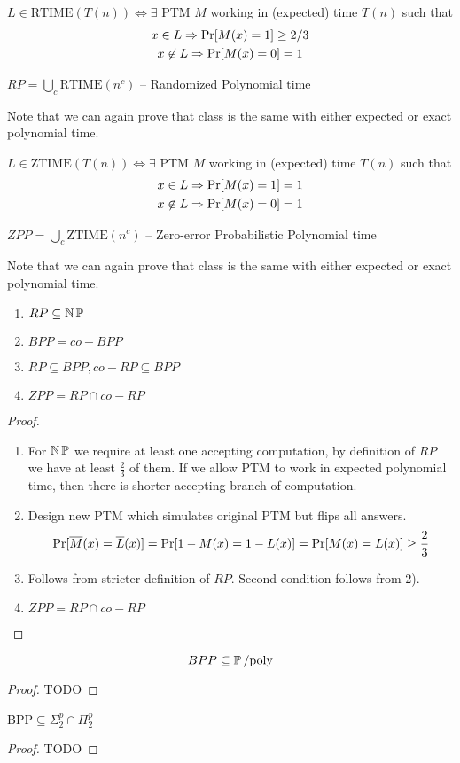 \begin{definition}[RTIME, RP]
	$L\in\text{RTIME}(T(n))\Leftrightarrow\exists$ PTM $M$ working in (expected) time $T(n)$ such that
    \begin{gather*}
    	x\in L\Rightarrow \operatorname{Pr}[M(x)=1]\geq 2/3\\
	x\not\in L\Rightarrow\operatorname{Pr}[M(x)=0]=1
    \end{gather*}

    $RP=\bigcup_c\text{RTIME}(n^c)$ -- Randomized Polynomial time

    Note that we can again prove that class is the same with either expected or exact polynomial time.
\end{definition}
\begin{definition}
    $L\in\text{ZTIME}(T(n))\Leftrightarrow\exists$ PTM $M$ working in (expected) time $T(n)$ such that
    \begin{gather*}
    	x\in L\Rightarrow \operatorname{Pr}[M(x)=1]=1\\
	x\not\in L\Rightarrow\operatorname{Pr}[M(x)=0]=1
    \end{gather*}

    $ZPP=\bigcup_c\text{ZTIME}(n^c)$ -- Zero-error Probabilistic Polynomial time

    Note that we can again prove that class is the same with either expected or exact polynomial time.
\end{definition}
\begin{lemma}
    \begin{enumerate}
        \item $RP\subseteq \operatorname{\operatorname{\mathbb{N}}\mathbb{P}}$
        \item $BPP=co-BPP$
        \item $RP\subseteq BPP, co-RP\subseteq BPP$
        \item $ZPP=RP\cap co-RP$
    \end{enumerate}
\end{lemma}
\begin{proof}
    \begin{enumerate}
	    \item
		For $\operatorname{\operatorname{\mathbb{N}}\mathbb{P}}$ we require at least one accepting computation, by definition of $RP$ we have at least $\frac{2}{3}$ of them.
		If we allow PTM to work in expected polynomial time, then there is shorter accepting branch of computation.
        \item Design new PTM which simulates original PTM but flips all answers.
		\[ \operatorname{Pr}[\overline{M}(x) = \overline{L}(x)] = \operatorname{Pr}[1 - M(x) = 1 - L(x)] = \operatorname{Pr}[M(x) = L(x)] \geq \frac{2}{3} \]
	\item Follows from stricter definition of $RP$. Second condition follows from 2).
        \item $ZPP=RP\cap co-RP$
    \end{enumerate}
\end{proof}
\begin{theorem}
	\[ BPP \subseteq \operatorname{\operatorname{\mathbb{P}}/poly} \]
\end{theorem}
\begin{proof}
    TODO
\end{proof}
\begin{theorem}
    BPP$\subseteq \Sigma^p_2 \cap \Pi_2^p$
\end{theorem}
\begin{proof}
    TODO
\end{proof}
